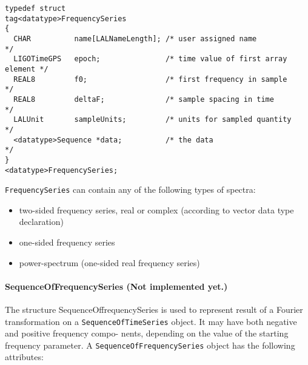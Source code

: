 \documentclass[]{ligodcc}
\renewcommand{\texttt}[1]{{\ttfamily\color{blue}#1}}
\begin{document}
{\footnotesize
\begin{verbatim}
typedef struct
tag<datatype>FrequencySeries
{
  CHAR          name[LALNameLength]; /* user assigned name                */
  LIGOTimeGPS   epoch;               /* time value of first array element */
  REAL8         f0;                  /* first frequency in sample         */
  REAL8         deltaF;              /* sample spacing in time            */
  LALUnit       sampleUnits;         /* units for sampled quantity        */
  <datatype>Sequence *data;          /* the data                          */
}
<datatype>FrequencySeries;
\end{verbatim}}

\noindent
{\tt FrequencySeries} can contain any of the following types of spectra:
\begin{itemize}
\item
two-sided frequency series, real or complex (according to vector data
type declaration)
\vspace{-0.15in}
\item
one-sided frequency series
\vspace{-0.15in}
\item
power-spectrum (one-sided real frequency series)
\end{itemize}

\paragraph{{\texttt {SequenceOfFrequencySeries}} {\bf (Not implemented
yet.)} \\}

The structure SequenceOffrequencySeries is used to represent result of
a Fourier transformation on a {\tt SequenceOfTimeSeries} object. It
may have both negative and positive frequency compo- nents, depending
on the value of the starting frequency parameter. A 
{\tt SequenceOfFrequencySeries} object has the following attributes:
\end{document}
